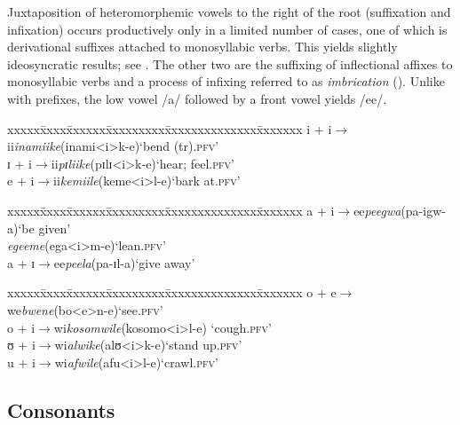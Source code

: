 Juxtaposition of heteromorphemic vowels to the right of the root (suffixation and infixation) occurs productively only in a limited number of cases, one of which is derivational suffixes attached to monosyllabic verbs. This yields slightly ideosyncratic results; see . The other two are the suffixing of inflectional affixes to monosyllabic verbs and a process of infixing referred to as \textit{imbrication} (). Unlike with prefixes, the low vowel /a/ followed by a front vowel yields /ee/.
\begin{exe}
	\ex
	\begin{tabbing}
		xxxxx\=xxxx\=xxxxxx\=xxxxxxxxx\=xxxxxxxxxxxxxx\=xxxxxxx\kill
		i + i\>$\rightarrow$\>ii\>\textit{inamiike}\>(\degree inami<i>k-e)\>`bend (tr).\textsc{pfv}'\\
		ɪ + i\>$\rightarrow$\>ii\>\textit{pɪliike}\>(\degree pɪlɪ<i>k-e)\>`hear; feel.\textsc{pfv}'\\
		e + i\>$\rightarrow$\>ii\>\textit{kemiile}\>(\degree keme<i>l-e)\>`bark at.\textsc{pfv}'
	\end{tabbing}
	\ex\begin{tabbing}
		xxxxx\=xxxx\=xxxxxx\=xxxxxxxxx\=xxxxxxxxxxxxxx\=xxxxxxx\kill
		a + i\>$\rightarrow$\>ee\>\textit{peegwa}\>(\degree pa-igw-a)\>`be given'\\
		\>\>\>\textit{egeeme}\>(\degree ega<i>m-e)\>`lean.\textsc{pfv}'
		\\a + ɪ\>$\rightarrow$\>ee\>\textit{peela}\>(\degree pa-ɪl-a)\>`give away'
	\end{tabbing}
	\ex
	\begin{tabbing}
		xxxxx\=xxxx\=xxxxxx\=xxxxxxxxx\=xxxxxxxxxxxxxx\=xxxxxxx\kill
		o + e\>$\rightarrow$\>we\>\textit{bwene}\>(\degree bo<e>n-e)\>`see.\textsc{pfv}'\\
		o + i\>$\rightarrow$\>wi\>\textit{kosomwile}\>(\degree kosomo<i>l-e)\> \lq cough.\textsc{pfv}'\\
		ʊ + i\>$\rightarrow$\>wi\>\textit{alwike}\>(\degree alʊ<i>k-e)\>`stand up.\textsc{pfv}'\\
		u + i\>$\rightarrow$\>wi\>\textit{afwile}\>(\degree afu<i>l-e)\>`crawl.\textsc{pfv}'
	\end{tabbing}
\end{exe}

\subsection{Consonants}
